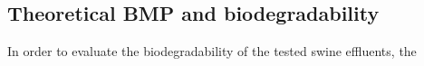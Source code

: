 \subsection{Theoretical BMP and biodegradability}
In order to evaluate the biodegradability of the tested swine effluents, the 
